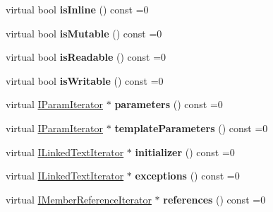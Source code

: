 \begin{DoxyCompactItemize}
\item 
\hypertarget{class_i_member_aa755498f7637d8881301d54cfce973cc}{virtual bool {\bfseries is\-Inline} () const =0}\label{class_i_member_aa755498f7637d8881301d54cfce973cc}

\item 
\hypertarget{class_i_member_acd97458dd9b872498c78f10026b085b7}{virtual bool {\bfseries is\-Mutable} () const =0}\label{class_i_member_acd97458dd9b872498c78f10026b085b7}

\item 
\hypertarget{class_i_member_ae29f9260a18b006742e8d518504f128e}{virtual bool {\bfseries is\-Readable} () const =0}\label{class_i_member_ae29f9260a18b006742e8d518504f128e}

\item 
\hypertarget{class_i_member_ae7b9eff6518e77dddc274851bf2ae330}{virtual bool {\bfseries is\-Writable} () const =0}\label{class_i_member_ae7b9eff6518e77dddc274851bf2ae330}

\item 
\hypertarget{class_i_member_aaf64111a0b0ad336375c861b6d9e7d37}{virtual \hyperlink{class_i_param_iterator}{I\-Param\-Iterator} $\ast$ {\bfseries parameters} () const =0}\label{class_i_member_aaf64111a0b0ad336375c861b6d9e7d37}

\item 
\hypertarget{class_i_member_a833b65bb6ef7e77fad6519309499d2ac}{virtual \hyperlink{class_i_param_iterator}{I\-Param\-Iterator} $\ast$ {\bfseries template\-Parameters} () const =0}\label{class_i_member_a833b65bb6ef7e77fad6519309499d2ac}

\item 
\hypertarget{class_i_member_ac0ad5b9f3517a82e39b75d6b801fc6bf}{virtual \hyperlink{class_i_linked_text_iterator}{I\-Linked\-Text\-Iterator} $\ast$ {\bfseries initializer} () const =0}\label{class_i_member_ac0ad5b9f3517a82e39b75d6b801fc6bf}

\item 
\hypertarget{class_i_member_afd0b9d17562744a785b45069a7529f90}{virtual \hyperlink{class_i_linked_text_iterator}{I\-Linked\-Text\-Iterator} $\ast$ {\bfseries exceptions} () const =0}\label{class_i_member_afd0b9d17562744a785b45069a7529f90}

\item 
\hypertarget{class_i_member_a89d26d675bb0da08d642cad3efdb3c34}{virtual \hyperlink{class_i_member_reference_iterator}{I\-Member\-Reference\-Iterator} $\ast$ {\bfseries references} () const =0}\label{class_i_member_a89d26d675bb0da08d642cad3efdb3c34}


\end{DoxyCompactItemize}
